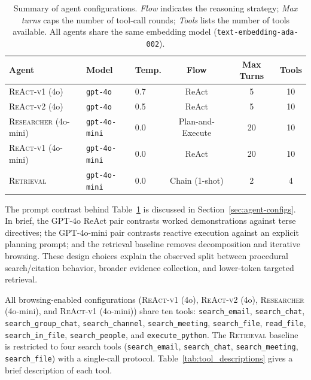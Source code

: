 \begin{table}[htbp]
\centering
\footnotesize
\caption{Summary of agent configurations. \emph{Flow} indicates the reasoning
  strategy; \emph{Max turns} caps the number of tool-call rounds; \emph{Tools}
  lists the number of tools available. All agents share the same embedding model
  (\texttt{text-embedding-ada-002}).}
\label{tab:agent_config_summary}
\begin{tabular}{lllccc}
\toprule
Agent & Model & Temp. & Flow & Max Turns & Tools \\
\midrule
\textsc{ReAct-v1} (4o)   & \texttt{gpt-4o}      & 0.7 & ReAct & 5  & 10 \\
\textsc{ReAct-v2} (4o)   & \texttt{gpt-4o}      & 0.5 & ReAct & 5  & 10 \\
\textsc{Researcher} (4o-mini)  & \texttt{gpt-4o-mini} & 0.0 & Plan-and-Execute & 20 & 10 \\
\textsc{ReAct-v1} (4o-mini)   & \texttt{gpt-4o-mini} & 0.0 & ReAct & 20 & 10 \\
\textsc{Retrieval}   & \texttt{gpt-4o-mini} & 0.0 & Chain (1-shot) & 2  & 4 \\
\bottomrule
\end{tabular}
\end{table}

The prompt contrast behind Table~\ref{tab:agent_config_summary} is discussed in
Section~\ref{sec:agent-configs}. In brief, the GPT-4o ReAct pair contrasts
worked demonstrations against terse directives; the GPT-4o-mini pair contrasts
reactive execution against an explicit planning prompt; and the retrieval
baseline removes decomposition and iterative browsing. These design choices
explain the observed split between procedural search/citation behavior, broader
evidence collection, and lower-token targeted retrieval.

All browsing-enabled configurations (\textsc{ReAct-v1} (4o), \textsc{ReAct-v2} (4o), \textsc{Researcher} (4o-mini), and \textsc{ReAct-v1} (4o-mini))
share ten tools: \texttt{search\_email}, \texttt{search\_chat},
\texttt{search\_group\_chat}, \texttt{search\_channel},
\texttt{search\_meeting}, \texttt{search\_file}, \texttt{read\_file},
\texttt{search\_in\_file}, \texttt{search\_people}, and
\texttt{execute\_python}. The \textsc{Retrieval} baseline is restricted to
four search tools (\texttt{search\_email}, \texttt{search\_chat},
\texttt{search\_meeting}, \texttt{search\_file}) with a single-call protocol.
Table~\ref{tab:tool_descriptions} gives a brief description of each tool.

